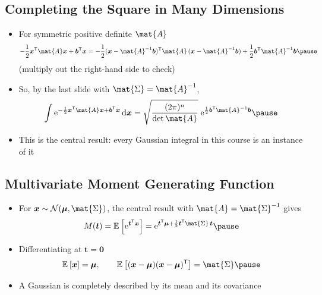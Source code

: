 \begin{slide}
\section[-2]{Completing the Square in Many Dimensions}

\begin{PauseHighLight}
  \begin{itemize}
  \item For symmetric positive definite $\mat{A}$
    \begin{align*}
      -\frac12\bm{x}^\tr\mat{A}\bm{x} + \bm{b}^\tr\bm{x}
      = -\frac12(\bm{x}-\mat{A}^{-1}\bm{b})^\tr\mat{A}\,
      (\bm{x}-\mat{A}^{-1}\bm{b}) + \frac12\bm{b}^\tr\mat{A}^{-1}\bm{b}\pause
    \end{align*}
    (multiply out the right-hand side to check)\pause
  \item So, by the last slide with $\mat{\Sigma} = \mat{A}^{-1}$,
    \begin{align*}
      \int \e{-\frac12\bm{x}^\tr\mat{A}\bm{x} + \bm{b}^\tr\bm{x}}\,\dd\bm{x}
      = \sqrt{\frac{(2\pi)^n}{\det\mat{A}}}\;
      \e{\frac12\bm{b}^\tr\mat{A}^{-1}\bm{b}}\pause
    \end{align*}
  \item This is the central result: every Gaussian integral in this
    course is an instance of it\pause
  \end{itemize}
\end{PauseHighLight}

\end{slide}


\begin{slide}
\section[-2]{Multivariate Moment Generating Function}

\begin{PauseHighLight}
  \begin{itemize}
  \item For $\bm{x}\sim\mathcal{N}(\bm{\mu},\mat{\Sigma})$, the central
    result with $\mat{A}=\mat{\Sigma}^{-1}$ gives
    \begin{align*}
      M(\bm{t}) = \av{\e{\bm{t}^\tr\bm{x}}}
      = \e{\bm{t}^\tr\bm{\mu} + \frac12\bm{t}^\tr\mat{\Sigma}\,\bm{t}}\pause
    \end{align*}
  \item Differentiating at $\bm{t}=\bm{0}$
    \begin{align*}
      \av{\bm{x}} = \bm{\mu}, \qquad
      \av{(\bm{x}-\bm{\mu})(\bm{x}-\bm{\mu})^\tr} = \mat{\Sigma}\pause
    \end{align*}
  \item A Gaussian is completely described by its mean and its
    covariance\pause
  \end{itemize}
\end{PauseHighLight}

\end{slide}

